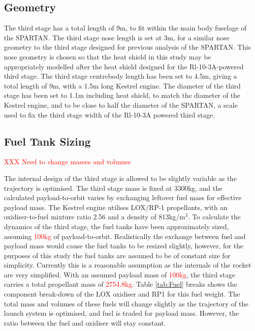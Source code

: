  
 
 
 \subsection{Geometry}\label{sec:3int}

The third stage has a total length of 9m, to fit within the main body fuselage of the SPARTAN.
 The third stage nose length is set at 3m, for a similar nose geometry to the third stage designed for previous analysis of the SPARTAN\cite{Preller2017b}. This nose geometry is chosen so that the heat shield in this study may be appropriately modelled after the heat shield designed for the Rl-10-3A-powered third stage\cite{Preller2017b}.
 The third stage centrebody length has been set to 4.5m, giving a total length of 9m, with a 1.5m long Kestrel engine\cite{Vehicle2008}. The diameter of the third stage has been set to 1.1m including heat shield, to match the diameter of the Kestrel engine, and to be close to half the diameter of the SPARTAN, a scale used to fix the third stage width of the Rl-10-3A powered third stage\cite{Preller2017b}.  






	


\subsection{Fuel Tank Sizing}
\textcolor{red}{XXX Need to change masses and volumes}

The internal design of the third stage is allowed to be slightly variable as the trajectory is optimised. The third stage mass is fixed at 3300kg, and the calculated payload-to-orbit varies by exchanging leftover fuel mass for effective payload mass. The Kestrel engine utilises LOX/RP-1 propellants, with an oxidiser-to-fuel mixture ratio 2.56\cite{RPE} and a density of 813kg/m$^3$\cite{Magee}. 
To calculate the dynamics of the third stage, the fuel tanks have been approximately sized, assuming \textcolor{red}{100kg} of payload-to-orbit. Realistically the exchange between fuel and payload mass would cause the fuel tanks to be resized slightly, however, for the purposes of this study the fuel tanks are assumed to be of constant size for simplicity. Currently this is a reasonable assumption as the internals of the rocket are very simplified. With an assumed payload mass of \textcolor{red}{100kg}, the third stage carries a total propellant mass of \textcolor{red}{2754.8kg}. Table \ref{tab:Fuel} breaks shows the component break-down of the LOX oxidiser and RP1 for this fuel weight. The total mass and volumes of these fuels will change slightly as the trajectory of the launch system is optimised, and fuel is traded for payload mass. However, the ratio between the fuel and oxidiser will stay constant. 

